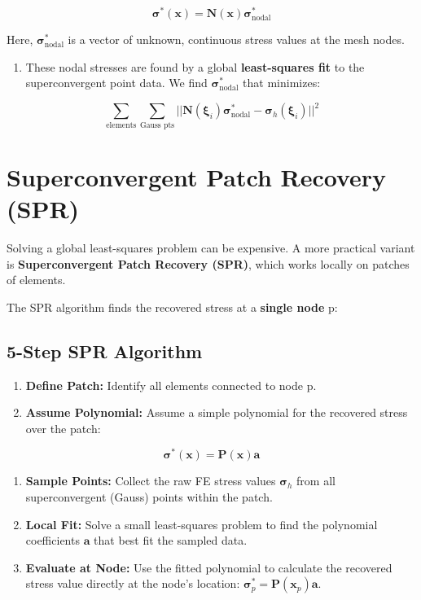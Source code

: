 \documentclass[
  11pt,
  a4paper,
]{scrbook}
\providecommand{\tightlist}{%
  \setlength{\itemsep}{0pt}\setlength{\parskip}{0pt}}\usepackage{longtable,booktabs,array}
\begin{document}
\[\boldsymbol{\sigma}^*(\mathbf{x}) = \mathbf{N}(\mathbf{x}) \boldsymbol{\sigma}_{\text{nodal}}^*\]

Here, \(\boldsymbol{\sigma}_{\text{nodal}}^*\) is a vector of unknown,
continuous stress values at the mesh nodes.

\begin{enumerate}
\def\labelenumi{\arabic{enumi}.}
\setcounter{enumi}{1}
\tightlist
\item
  These nodal stresses are found by a global \textbf{least-squares fit}
  to the superconvergent point data. We find
  \(\boldsymbol{\sigma}_{\text{nodal}}^*\) that minimizes:
\end{enumerate}

\[\sum_{\text{elements}} \sum_{\text{Gauss pts}} || \mathbf{N}(\boldsymbol{\xi}_i)\boldsymbol{\sigma}_{\text{nodal}}^* - \boldsymbol{\sigma}_h(\boldsymbol{\xi}_i) ||^2\]

\section{Superconvergent Patch Recovery
(SPR)}\label{superconvergent-patch-recovery-spr}

Solving a global least-squares problem can be expensive. A more
practical variant is \textbf{Superconvergent Patch Recovery (SPR)},
which works locally on patches of elements.

The SPR algorithm finds the recovered stress at a \textbf{single node}
p:

\subsection{5-Step SPR Algorithm}\label{step-spr-algorithm}

\begin{enumerate}
\def\labelenumi{\arabic{enumi}.}
\item
  \textbf{Define Patch:} Identify all elements connected to node p.
\item
  \textbf{Assume Polynomial:} Assume a simple polynomial for the
  recovered stress over the patch:
\end{enumerate}

\[\boldsymbol{\sigma}^*(\mathbf{x}) = \mathbf{P}(\mathbf{x}) \mathbf{a}\]

\begin{enumerate}
\def\labelenumi{\arabic{enumi}.}
\setcounter{enumi}{2}
\item
  \textbf{Sample Points:} Collect the raw FE stress values
  \(\boldsymbol{\sigma}_h\) from all superconvergent (Gauss) points
  within the patch.
\item
  \textbf{Local Fit:} Solve a small least-squares problem to find the
  polynomial coefficients \(\mathbf{a}\) that best fit the sampled data.
\item
  \textbf{Evaluate at Node:} Use the fitted polynomial to calculate the
  recovered stress value directly at the node's location:
  \(\boldsymbol{\sigma}^*_p = \mathbf{P}(\mathbf{x}_p)\mathbf{a}\).
\end{enumerate}
\end{document}
